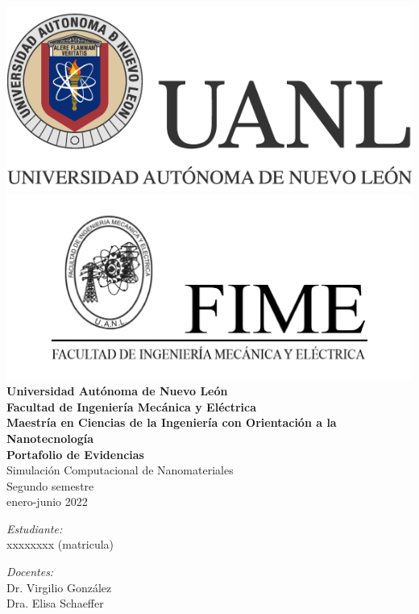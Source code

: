 \documentclass[a4paper,12pt]{report}
\begin{document}
\begin{titlepage}

\begin{center}


	\includegraphics[scale=0.5]{uanl.png}
	\includegraphics[scale=0.5]{fime.png}\\[1.5cm]
	

{\large \textbf{Universidad Autónoma de Nuevo León}\\[0.2cm]}
  \textbf{Facultad de Ingeniería Mecánica y Eléctrica}\\[0.1cm]
    \textbf{Maestría en Ciencias de la Ingeniería con Orientación a la Nanotecnología}
\textsc{\Large }\\[1.5cm]
{\large \bfseries Portafolio de Evidencias}\\[0.5cm]
{\large Simulación Computacional de Nanomateriales}\\[.2cm]
{Segundo semestre}\\[.2cm]
{enero-junio 2022}\\[.5cm]



\noindent
\begin{minipage}{0.4\textwidth}
  \begin{flushleft} \large
    \emph{\color{orange!80!black}Estudiante:}\\
    xxxxxxxx (matricula)\\
  \end{flushleft}
\end{minipage}%
\begin{minipage}{0.5\textwidth}
  \begin{flushright} \large
    \emph{\color{orange!80!black}Docentes:} \\
    Dr. Virgilio González\\
    Dra. Elisa Schaeffer\\
  \end{flushright}
\end{minipage}\\[1cm]


\end{center}
\end{titlepage}
\end{document}
